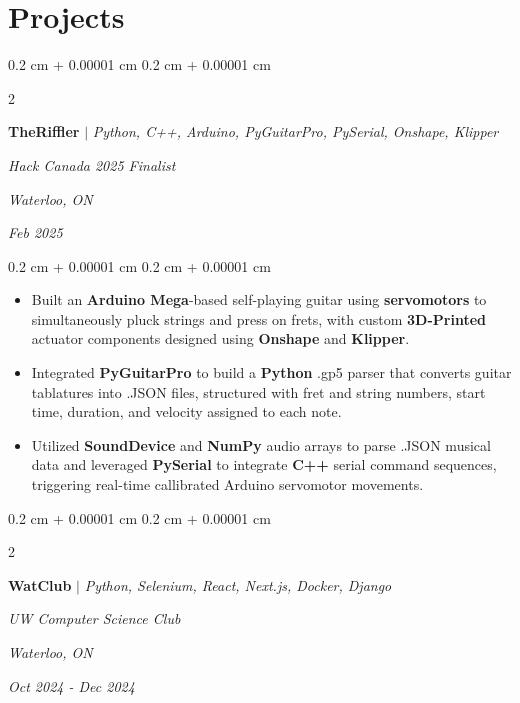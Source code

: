 \documentclass[10pt, letterpaper]{article}
\newenvironment{highlights}{
    \begin{itemize}[
        topsep=0.10 cm,
        parsep=0.10 cm,
        partopsep=0pt,
        itemsep=0pt,
        leftmargin=0.4 cm + 10pt
    ]
}{
    \end{itemize}
} %
\newenvironment{onecolentry}{
    \begin{adjustwidth}{
        0.2 cm + 0.00001 cm
    }{
        0.2 cm + 0.00001 cm
    }
}{
    \end{adjustwidth}
} %
\newenvironment{twocolentry}[2][]{
    \onecolentry
    \def\secondColumn{#2}
    \setcolumnwidth{\fill, 4.5 cm}
    \begin{paracol}{2}
}{
    \switchcolumn \raggedleft \secondColumn
    \end{paracol}
    \endonecolentry
} %
\let\hrefWithoutArrow\href
\renewcommand{\href}[2]{\hrefWithoutArrow{#1}{\ifthenelse{\equal{#2}{}}{ }{#2 }\raisebox{.15ex}{\footnotesize \faExternalLink*}}}
\begin{document}
    \section{Projects}

       \begin{twocolentry}{
         \textit{Waterloo, ON}    
            
        \textit{Feb 2025}}
            \textbf{\textbf{TheRiffler }}\mbox{\hrefWithoutArrow{https://github.com/vinny-nguyen/TheRiffler}{\color{black}{\footnotesize\faGithub}}}
            $|$ \emph{Python, C++, Arduino, PyGuitarPro, PySerial, Onshape, Klipper}
            
            \textit{Hack Canada 2025 Finalist}
        \end{twocolentry}
        
        \vspace{0.10 cm}
        \begin{onecolentry}
            \begin{highlights}
                \item Built an \textbf{Arduino Mega}-based self-playing guitar using \textbf{servomotors} to simultaneously pluck strings and press on frets, with custom \textbf{3D-Printed} actuator components designed using \textbf{Onshape} and \textbf{Klipper}.
                \item Integrated \textbf{PyGuitarPro} to build a \textbf{Python} .gp5 parser that converts guitar tablatures into .JSON files, structured with fret and string numbers, start time, duration, and velocity assigned to each note.
                \item Utilized \textbf{SoundDevice} and \textbf{NumPy} audio arrays to parse .JSON musical data and leveraged \textbf{PySerial} to integrate \textbf{C++} serial command sequences, triggering real-time callibrated Arduino servomotor movements.
            \end{highlights}
        \end{onecolentry}

    \vspace{0.2 cm}

\begin{twocolentry}{
        \textit{Waterloo, ON}    
            
        \textit{Oct 2024 - Dec 2024}}
            \textbf{\textbf{WatClub }}\mbox{\hrefWithoutArrow{https://github.com/Brucewang15/WatClub}{\color{black}{\footnotesize\faGithub}}} $|$ \emph{Python, Selenium, React, Next.js, Docker, Django}
            
            \textit{UW Computer Science Club}
        \end{twocolentry}
        
\end{document}
